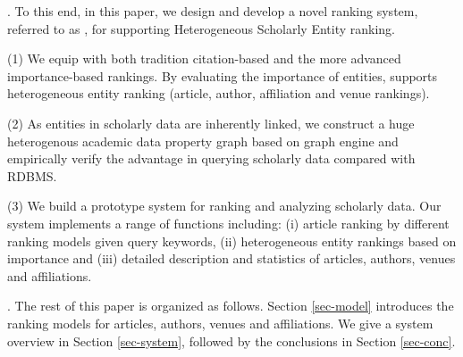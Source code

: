 


.
To this end, in this paper, we design and develop a novel ranking system, referred to as \oursystem, for supporting Heterogeneous Scholarly Entity
ranking.

\noindent (1) We equip \oursystem with both tradition citation-based and the more advanced importance-based rankings. By evaluating the importance of entities, \oursystem supports heterogeneous entity ranking (\ie article, author, affiliation and venue rankings).


\noindent (2) As entities in scholarly data are inherently linked, we construct a huge heterogenous academic data property graph based on graph engine and empirically verify the advantage in querying scholarly data compared with RDBMS.

\noindent (3) We build a prototype system for ranking and analyzing scholarly data. Our system implements a range of functions including: (i) article ranking by different ranking models given query keywords, (ii) heterogeneous entity rankings based on importance and (iii) detailed description and statistics of articles, authors, venues and affiliations.





.
The rest of this paper is organized as follows. Section \ref{sec-model} introduces the ranking models for articles, authors, venues and affiliations. We give a system overview in Section \ref{sec-system}, followed by the conclusions in Section \ref{sec-conc}.
